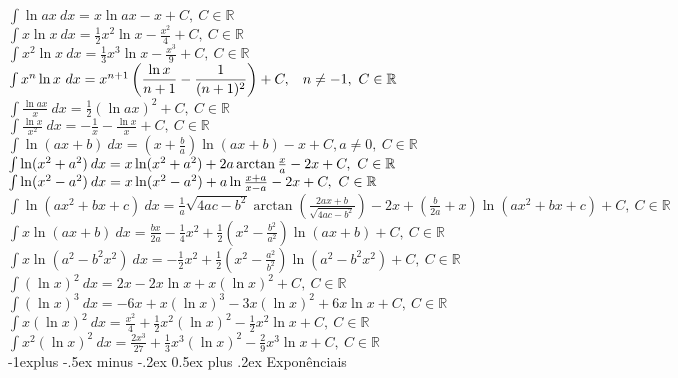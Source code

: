 \documentclass[10pt,landscape]{article}
\makeatletter
\renewcommand{\subsection}{\@startsection{subsection}{2}{0mm}%
                                {-1explus -.5ex minus -.2ex}%
                                {0.5ex plus .2ex}%
                                {\normalfont\normalsize\bfseries}}
\makeatother
\begin{document}
\begin{multicols}{3}
$\int \ln ax\  dx = x \ln ax - x + C,\ C \in \mathbb{R}$\\
$\int x \ln x \ dx = \frac{1}{2} x^2 \ln x-\frac{x^2}{4} + C,\ C \in \mathbb{R}$\\
$\int x^2 \ln x \ dx = \frac{1}{3} x^3 \ln x-\frac{x^3}{9} + C,\ C \in \mathbb{R}$\\
$\int x^n \ln x\ dx = x^{n+1}\left( \dfrac{\ln x}{n+1}-\dfrac{1}{(n+1)^2}\right) + C,\hspace{2ex} n\neq -1,\ C \in \mathbb{R}$\\
$\int \frac{\ln ax}{x}\ dx = \frac{1}{2}\left ( \ln ax \right)^2 + C,\ C \in \mathbb{R}$\\
$\int \frac{\ln x}{x^2}\ dx = -\frac{1}{x}-\frac{\ln x}{x} + C,\ C \in \mathbb{R}$\\
$\int \ln (ax + b) \ dx = \left ( x + \frac{b}{a} \right) \ln (ax+b) - x + C, a\ne 0,\ C \in \mathbb{R}$\\
$\int \ln  ( x^2 + a^2 )\hspace{.5ex} {dx} = x \ln (x^2 + a^2  ) +2a\arctan \frac{x}{a} - 2x + C,\ C \in \mathbb{R}$\\
$\int \ln  ( x^2 - a^2 )\hspace{.5ex} {dx} = x \ln (x^2 - a^2  ) +a\ln \frac{x+a}{x-a} - 2x + C,\ C \in \mathbb{R}$\\
$\int \ln \left ( ax^2 + bx + c\right) \ dx  = \frac{1}{a}\sqrt{4ac-b^2}\arctan(\frac{2ax+b}{\sqrt{4ac-b^2}})-2x + \left( \frac{b}{2a}+x \right )\ln \left (ax^2+bx+c \right) + C,\ C \in \mathbb{R}$\\
$\int x \ln (ax + b)\ dx = \frac{bx}{2a}-\frac{1}{4}x^2 +\frac{1}{2}\left(x^2-\frac{b^2}{a^2}\right)\ln (ax+b) + C,\ C \in \mathbb{R}$\\
$\int x \ln \left ( a^2 - b^2 x^2 \right )\ dx = -\frac{1}{2}x^2+ \frac{1}{2}\left( x^2 - \frac{a^2}{b^2} \right ) \ln \left (a^2 -b^2 x^2 \right) + C,\ C \in \mathbb{R}$\\
$\int (\ln x)^2\ dx = 2x - 2x \ln x + x (\ln x)^2 + C,\ C \in \mathbb{R}$\\
$\int (\ln x)^3\ dx = -6 x+x (\ln x)^3-3 x (\ln x)^2+6 x \ln x + C,\ C \in \mathbb{R}$\\
$\int x (\ln x)^2\ dx = \frac{x^2}{4}+\frac{1}{2} x^2 (\ln x)^2-\frac{1}{2} x^2 \ln x + C,\ C \in \mathbb{R}$\\
$\int x^2 (\ln x)^2\ dx = \frac{2 x^3}{27}+\frac{1}{3} x^3 (\ln x)^2-\frac{2}{9} x^3 \ln x + C,\ C \in \mathbb{R}$\\

\subsection{Exponênciais}


\end{multicols}
\end{document}
